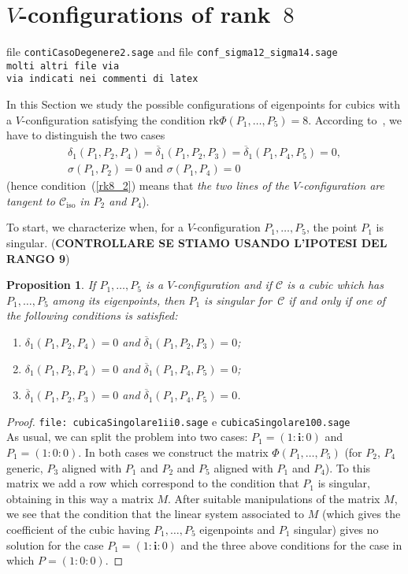 \documentclass{amsart}
\theoremstyle{plain}
\newtheorem{prop}[lemma]{Proposition}
\theoremstyle{definition}
\newcommand{\iso}{\mathcal{C}_{\mathrm{iso}}}
\newcommand{\iii}{\textbf{i}}
\newcommand{\rk}{\ensuremath{\mathrm{rk}}}
\begin{document}
\section{$V$-configurations of rank~$8$}
\label{rank_8}
file \verb+contiCasoDegenere2.sage+ and file
\verb+conf_sigma12_sigma14.sage+\\
\verb+molti altri file via +\\
\verb+via indicati nei commenti di latex+

In this Section we study the possible configurations of
eigenpoints for cubics with a $V$-configuration
satisfying the condition $\rk \Phi(P_1, \dots, P_5) = 8$. According
to~, we have to distinguish the two cases
\begin{eqnarray}
\delta_1(P_1, P_2, P_4)=\overline{\delta}_1(P_1, P_2, P_3) =
\overline{\delta}_1(P_1, P_4, P_5) = 0,
\label{rk8_1}\\
\sigma(P_1, P_2) = 0 \mbox{ and } \sigma(P_1, P_4) = 0
\label{rk8_2}
\end{eqnarray}
(hence condition~(\ref{rk8_2}) means that \emph{the two lines of
the $V$-configuration are tangent to $\iso$ in $P_2$ and $P_4$}).

To start, we characterize when, for a $V$-configuration $P_1, \dotsc, P_5$, the point
$P_1$ is singular.
(\textbf{CONTROLLARE SE STIAMO USANDO L'IPOTESI DEL RANGO 9})

\begin{prop}
\label{proposition:P1_sing}
If $P_1, \dots, P_5$ is a $V$-configuration and if $\mathcal{C}$ is a cubic which
has $P_1, \dots, P_5$ among its eigenpoints, then $P_1$ is singular for~$\mathcal{C}$ if
and only if one of the following conditions is satisfied:
\begin{enumerate}
\item $\delta_1(P_1, P_2, P_4) = 0$ and $\overline{\delta}_1(P_1, P_2, P_3) = 0$;
\item $\delta_1(P_1, P_2, P_4) = 0$ and $\overline{\delta}_1(P_1, P_4, P_5) = 0$;
\item $\overline{\delta}_1(P_1, P_2, P_3) = 0$ and
$\overline{\delta}_1(P_1, P_4, P_5) = 0$.
\end{enumerate}
\end{prop}
\begin{proof}
\verb+file: cubicaSingolare1ii0.sage+ e \verb+cubicaSingolare100.sage+\\
As usual, we can split the problem into two cases: $P_1 = (1: \iii: 0)$
and $P_1 = (1: 0: 0)$. In both cases we construct the matrix
$\Phi(P_1, \dots, P_5)$ (for $P_2$, $P_4$ generic, $P_3$ aligned with
$P_1$ and $P_2$ and $P_5$ aligned with $P_1$ and $P_4$). To this matrix we add
a row which correspond to the condition that $P_1$ is singular, obtaining
in this way a matrix $M$. After
suitable manipulations of the matrix $M$, we see that the condition that
the linear system associated to $M$ (which gives the coefficient of the cubic
having $P_1, \dots, P_5$ eigenpoints and $P_1$ singular) gives no solution
for the case $P_1=(1: \iii: 0)$ and the three above conditions for the
case in which $P = (1: 0: 0)$.
\end{proof}
\end{document}
